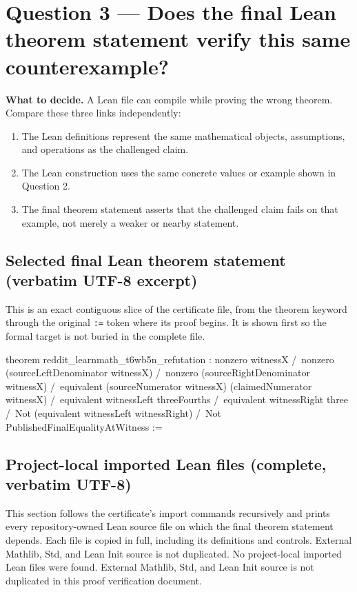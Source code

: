 \documentclass[11pt]{article}
\begin{document}
\section*{Question 3 --- Does the final Lean theorem statement verify this same counterexample?}
\textbf{What to decide.} A Lean file can compile while proving the wrong theorem. Compare these three links independently:
\begin{enumerate}
\item The Lean definitions represent the same mathematical objects, assumptions, and operations as the challenged claim.
\item The Lean construction uses the same concrete values or example shown in Question 2.
\item The final theorem statement asserts that the challenged claim fails on that example, not merely a weaker or nearby statement.
\end{enumerate}
\subsection*{Selected final Lean theorem statement (verbatim UTF-8 excerpt)}
This is an exact contiguous slice of the certificate file, from the theorem keyword through the original \texttt{:=} token where its proof begins. It is shown first so the formal target is not buried in the complete file.
\begin{Vlean}
theorem reddit_learnmath_t6wb5n_refutation :
    nonzero witnessX /\
    nonzero (sourceLeftDenominator witnessX) /\
    nonzero (sourceRightDenominator witnessX) /\
    equivalent (sourceNumerator witnessX) (claimedNumerator witnessX) /\
    equivalent witnessLeft threeFourths /\
    equivalent witnessRight three /\
    Not (equivalent witnessLeft witnessRight) /\
    Not PublishedFinalEqualityAtWitness :=
\end{Vlean}
\subsection*{Project-local imported Lean files (complete, verbatim UTF-8)}
This section follows the certificate's import commands recursively and prints every repository-owned Lean source file on which the final theorem statement depends. Each file is copied in full, including its definitions and controls. External Mathlib, Std, and Lean Init source is not duplicated.
No project-local imported Lean files were found. External Mathlib, Std, and Lean Init source is not duplicated in this proof verification document.
\end{document}
